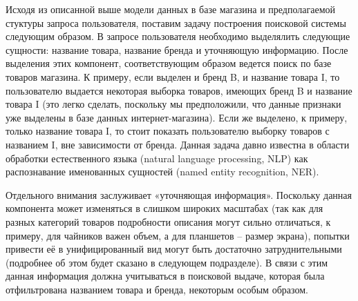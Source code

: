 \documentclass[12pt,a4paper]{article}
\begin{document}
\begin{table}[H]
\begin{center}
    \caption{Примеры запросов и соответствующих им смысловых частей}
\end{center}
\end{table}

Исходя из описанной выше модели данных в базе магазина и предполагаемой стуктуры запроса пользователя, поставим задачу построения поисковой системы следующим образом. В запросе пользователя необходимо выделялить следующие сущности: название товара, название бренда и уточняющую информацию. После выделения этих компонент, соответствующим образом ведется поиск по базе товаров магазина. К примеру, если выделен и бренд B, и название товара I, то пользователю выдается некоторая выборка товаров, имеющих бренд B и название товара I (это легко сделать, поскольку мы предположили, что данные признаки уже выделены в базе данных интернет-магазина). Если же выделено, к примеру, только название товара I, то стоит показать пользователю выборку товаров с названием I, вне зависимости от бренда. Данная задача давно известна в области обработки естественного языка (natural language processing, NLP) как распознавание именованных сущностей (named entity recognition, NER).

Отдельного внимания заслуживает «уточняющая информация». Поскольку данная компонента может изменяться в слишком широких масштабах (так как для разных категорий товаров подробности описания могут сильно отличаться, к примеру, для чайников важен объем, а для планшетов -- размер экрана), попытки привести её в унифицированный вид могут быть достаточно затруднительными (подробнее об этом будет сказано в следующем подразделе). В связи с этим данная информация должна учитываться в поисковой выдаче, которая была отфильтрована названием товара и бренда, некоторым особым образом.
\end{document}
